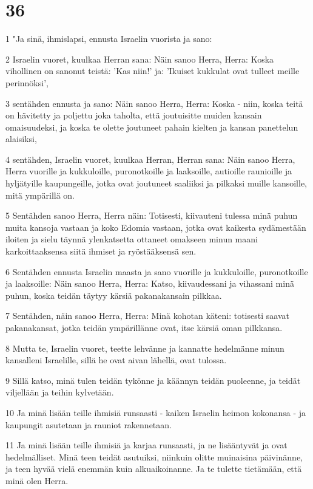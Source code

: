 \chapter{36}

\par 1 "Ja sinä, ihmislapsi, ennusta Israelin vuorista ja sano:
\par 2 Israelin vuoret, kuulkaa Herran sana: Näin sanoo Herra, Herra: Koska vihollinen on sanonut teistä: 'Kas niin!' ja: 'Ikuiset kukkulat ovat tulleet meille perinnöksi',
\par 3 sentähden ennusta ja sano: Näin sanoo Herra, Herra: Koska - niin, koska teitä on hävitetty ja poljettu joka taholta, että joutuisitte muiden kansain omaisuudeksi, ja koska te olette joutuneet pahain kielten ja kansan panettelun alaisiksi,
\par 4 sentähden, Israelin vuoret, kuulkaa Herran, Herran sana: Näin sanoo Herra, Herra vuorille ja kukkuloille, puronotkoille ja laaksoille, autioille raunioille ja hyljätyille kaupungeille, jotka ovat joutuneet saaliiksi ja pilkaksi muille kansoille, mitä ympärillä on.
\par 5 Sentähden sanoo Herra, Herra näin: Totisesti, kiivauteni tulessa minä puhun muita kansoja vastaan ja koko Edomia vastaan, jotka ovat kaikesta sydämestään iloiten ja sielu täynnä ylenkatsetta ottaneet omakseen minun maani karkoittaaksensa siitä ihmiset ja ryöstääksensä sen.
\par 6 Sentähden ennusta Israelin maasta ja sano vuorille ja kukkuloille, puronotkoille ja laaksoille: Näin sanoo Herra, Herra: Katso, kiivaudessani ja vihassani minä puhun, koska teidän täytyy kärsiä pakanakansain pilkkaa.
\par 7 Sentähden, näin sanoo Herra, Herra: Minä kohotan käteni: totisesti saavat pakanakansat, jotka teidän ympärillänne ovat, itse kärsiä oman pilkkansa.
\par 8 Mutta te, Israelin vuoret, teette lehvänne ja kannatte hedelmänne minun kansalleni Israelille, sillä he ovat aivan lähellä, ovat tulossa.
\par 9 Sillä katso, minä tulen teidän tykönne ja käännyn teidän puoleenne, ja teidät viljellään ja teihin kylvetään.
\par 10 Ja minä lisään teille ihmisiä runsaasti - kaiken Israelin heimon kokonansa - ja kaupungit asutetaan ja rauniot rakennetaan.
\par 11 Ja minä lisään teille ihmisiä ja karjaa runsaasti, ja ne lisääntyvät ja ovat hedelmälliset. Minä teen teidät asutuiksi, niinkuin olitte muinaisina päivinänne, ja teen hyvää vielä enemmän kuin alkuaikoinanne. Ja te tulette tietämään, että minä olen Herra.
